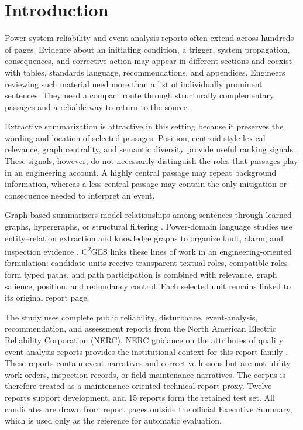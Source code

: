 \documentclass[information,article,submit,moreauthors]{Definitions/mdpi}
\newcommand{\cges}{C\textsuperscript{2}GES}
\begin{document}
\section{Introduction}

Power-system reliability and event-analysis reports often extend across hundreds of pages. Evidence about an initiating condition, a trigger, system propagation, consequences, and corrective action may appear in different sections and coexist with tables, standards language, recommendations, and appendices. Engineers reviewing such material need more than a list of individually prominent sentences. They need a compact route through structurally complementary passages and a reliable way to return to the source.

Extractive summarization is attractive in this setting because it preserves the wording and location of selected passages. Position, centroid-style lexical relevance, graph centrality, and semantic diversity provide useful ranking signals \cite{zhong2020extractive,bi2021aredsum,liu2021unsupervised,mihalcea2004textrank,reimers2019sentencebert}. These signals, however, do not necessarily distinguish the roles that passages play in an engineering account. A highly central passage may repeat background information, whereas a less central passage may contain the only mitigation or consequence needed to interpret an event.

Graph-based summarizers model relationships among sentences through learned graphs, hypergraphs, or structural filtering \cite{siragusa2022sentencegraph,onan2024mches,hark2025mis}. Power-domain language studies use entity--relation extraction and knowledge graphs to organize fault, alarm, and inspection evidence \cite{liu2022powerfault,ma2025alarm,zgg2026bridge}. \cges{} links these lines of work in an engineering-oriented formulation: candidate units receive transparent textual roles, compatible roles form typed paths, and path participation is combined with relevance, graph salience, position, and redundancy control. Each selected unit remains linked to its original report page.

The study uses complete public reliability, disturbance, event-analysis, recommendation, and assessment reports from the North American Electric Reliability Corporation (NERC). NERC guidance on the attributes of quality event-analysis reports provides the institutional context for this report family \cite{nerc2015qualityreport}. These reports contain event narratives and corrective lessons but are not utility work orders, inspection records, or field-maintenance narratives. The corpus is therefore treated as a maintenance-oriented technical-report proxy. Twelve reports support development, and 15 reports form the retained test set. All candidates are drawn from report pages outside the official Executive Summary, which is used only as the reference for automatic evaluation.
\end{document}
